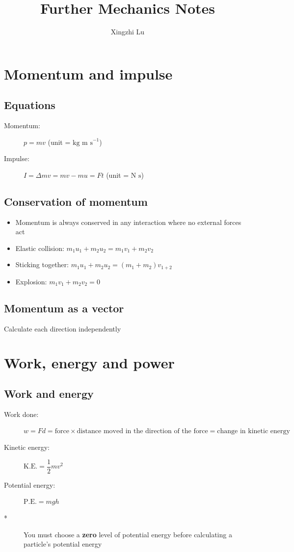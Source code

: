 \documentclass[11pt, A4paper]{article}
\title{Further Mechanics Notes}
\author{Xingzhi Lu}
\begin{document}
	\maketitle
	
	\section[1 Momentum and impulse]{Momentum and impulse}
	\subsection{Equations}
	\begin{description}
		\item[Momentum:] $p=mv$ (unit = $\text{kg m s}^{-1}$)
		\item[Impulse:] $I=\Delta mv=mv-mu=Ft$ (unit = $\text{N s}$)
	\end{description}
	
	\subsection{Conservation of momentum}
	\begin{itemize}
		\item Momentum is always conserved in any interaction where no external forces act
		\item Elastic collision: $m_1u_1+m_2u_2=m_1v_1+m_2v_2$
		\item Sticking together: $m_1u_1+m_2u_2=(m_1+m_2)v_{1+2}$
		\item Explosion: $m_1v_1+m_2v_2=0$
	\end{itemize}
	
	\subsection{Momentum as a vector}
	Calculate each direction independently
	
	
	
	\section[2 Work, energy and power]{Work, energy and power}
	\subsection{Work and energy}
	\begin{description}
		\item[Work done:] $w=Fd=\text{force}\times\text{distance moved in the direction of the force}=\text{change in kinetic energy}$
		\item[Kinetic energy:] $\text{K.E.}=\dfrac{1}{2}mv^2$
		\item[Potential energy:] $\text{P.E.}=mgh$
		\item[*] You must choose a \textbf{zero} level of potential energy before calculating a particle's potential energy
	\end{description}
	
\end{document}
